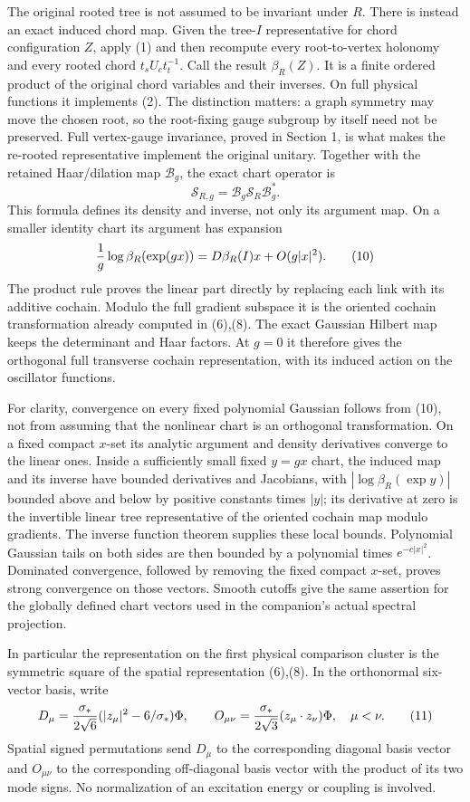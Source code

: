 \documentclass[
  11pt,
]{article}
\begin{document}
The original rooted tree is not assumed to be invariant under \(R\).
There is instead an exact induced chord map. Given the tree-\(I\)
representative for chord configuration \(Z\), apply (1) and then
recompute every root-to-vertex holonomy and every rooted chord
\(t_sU_ct_t^{-1}\). Call the result \(\beta_R(Z)\). It is a finite
ordered product of the original chord variables and their inverses. On
full physical functions it implements (2). The distinction matters: a
graph symmetry may move the chosen root, so the root-fixing gauge
subgroup by itself need not be preserved. Full vertex-gauge invariance,
proved in Section 1, is what makes the re-rooted representative
implement the original unitary. Together with the retained Haar/dilation
map \(\mathcal B_g\), the exact chart operator is \[
 \mathscr S_{R,g}=\mathcal B_g\mathscr S_R\mathcal B_g^* .
 \tag{9}
\] This formula defines its density and inverse, not only its argument
map. On a smaller identity chart its argument has expansion \[
 {1\over g}\log\beta_R(\exp(gx))
                 =D\beta_R(I)x+O(g|x|^2).
 \tag{10}
\] The product rule proves the linear part directly by replacing each
link with its additive cochain. Modulo the full gradient subspace it is
the oriented cochain transformation already computed in (6),(8). The
exact Gaussian Hilbert map keeps the determinant and Haar factors. At
\(g=0\) it therefore gives the orthogonal full transverse cochain
representation, with its induced action on the oscillator functions.

For clarity, convergence on every fixed polynomial Gaussian follows from
(10), not from assuming that the nonlinear chart is an orthogonal
transformation. On a fixed compact \(x\)-set its analytic argument and
density derivatives converge to the linear ones. Inside a sufficiently
small fixed \(y=gx\) chart, the induced map and its inverse have bounded
derivatives and Jacobians, with \(|\log\beta_R(\exp y)|\) bounded above
and below by positive constants times \(|y|\); its derivative at zero is
the invertible linear tree representative of the oriented cochain map
modulo gradients. The inverse function theorem supplies these local
bounds. Polynomial Gaussian tails on both sides are then bounded by a
polynomial times \(e^{-c|x|^2}\). Dominated convergence, followed by
removing the fixed compact \(x\)-set, proves strong convergence on those
vectors. Smooth cutoffs give the same assertion for the globally defined
chart vectors used in the companion's actual spectral projection.

In particular the representation on the first physical comparison
cluster is the symmetric square of the spatial representation (6),(8).
In the orthonormal six-vector basis, write \[
 D_\mu={\sigma_*\over2\sqrt6}
           (|z_\mu|^2-6/\sigma_*)\Phi,\qquad
 O_{\mu\nu}={\sigma_*\over2\sqrt3}(z_\mu\cdot z_\nu)\Phi,\quad\mu<\nu .
 \tag{11}
\] Spatial signed permutations send \(D_\mu\) to the corresponding
diagonal basis vector and \(O_{\mu\nu}\) to the corresponding
off-diagonal basis vector with the product of its two mode signs. No
normalization of an excitation energy or coupling is involved.
\end{document}
